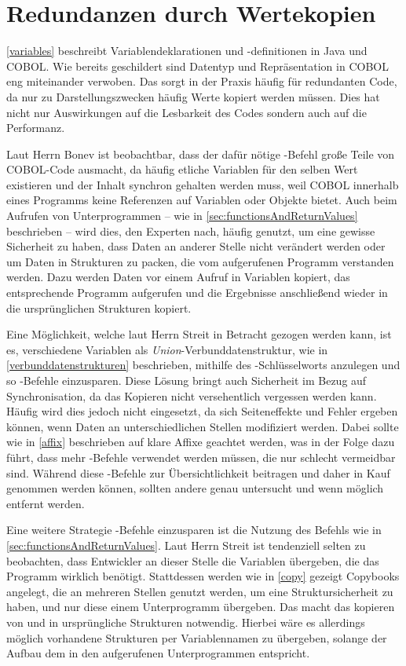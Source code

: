\section{Redundanzen durch Wertekopien}
\autoref{variables} beschreibt Variablendeklarationen und -definitionen in Java und COBOL. Wie bereits geschildert sind Datentyp und Repräsentation in COBOL eng miteinander verwoben. Das sorgt in der Praxis häufig für redundanten Code, da nur zu Darstellungszwecken häufig Werte kopiert werden müssen. Dies hat nicht nur Auswirkungen auf die Lesbarkeit des Codes sondern auch auf die Performanz.

Laut Herrn Bonev ist beobachtbar, dass der dafür nötige -Befehl große Teile von COBOL-Code ausmacht, da häufig etliche Variablen für den selben Wert existieren und der Inhalt synchron gehalten werden muss, weil COBOL innerhalb eines Programms keine Referenzen auf Variablen oder Objekte bietet. Auch beim Aufrufen von Unterprogrammen -- wie in \autoref{sec:functionsAndReturnValues} beschrieben -- wird dies, den Experten nach, häufig genutzt, um eine gewisse Sicherheit zu haben, dass Daten an anderer Stelle nicht verändert werden oder um Daten in Strukturen zu packen, die vom aufgerufenen Programm verstanden werden. Dazu werden Daten vor einem Aufruf in Variablen kopiert, das entsprechende Programm aufgerufen und die Ergebnisse anschließend wieder in die ursprünglichen Strukturen kopiert.

Eine Möglichkeit, welche laut Herrn Streit in Betracht gezogen werden kann, ist es, verschiedene Variablen als \textit{Union}-Verbunddatenstruktur, wie in \autoref{verbunddatenstrukturen} beschrieben, mithilfe des -Schlüsselworts anzulegen und so -Befehle einzusparen. Diese Lösung bringt auch Sicherheit im Bezug auf Synchronisation, da das Kopieren nicht versehentlich vergessen werden kann. Häufig wird dies jedoch nicht eingesetzt, da sich Seiteneffekte und Fehler ergeben können, wenn Daten an unterschiedlichen Stellen modifiziert werden. Dabei sollte wie in \autoref{affix} beschrieben auf klare Affixe geachtet werden, was in der Folge dazu führt, dass mehr -Befehle verwendet werden müssen, die nur schlecht vermeidbar sind. Während diese -Befehle zur Übersichtlichkeit beitragen und daher in Kauf genommen werden können, sollten andere genau untersucht und wenn möglich entfernt werden.

Eine weitere Strategie -Befehle einzusparen ist die Nutzung des  Befehls wie in \autoref{sec:functionsAndReturnValues}. Laut Herrn Streit ist tendenziell selten zu beobachten, dass Entwickler an dieser Stelle die Variablen übergeben, die das Programm wirklich benötigt. Stattdessen werden wie in \autoref{copy} gezeigt Copybooks angelegt, die an mehreren Stellen genutzt werden, um eine Struktursicherheit zu haben, und nur diese einem Unterprogramm übergeben. Das macht das kopieren von und in ursprüngliche Strukturen notwendig. Hierbei wäre es allerdings möglich vorhandene Strukturen per Variablennamen zu übergeben, solange der Aufbau dem in den aufgerufenen Unterprogrammen entspricht.

